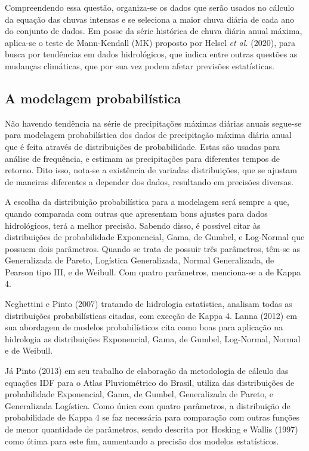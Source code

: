 Compreendendo essa questão, organiza-se os dados que serão usados no cálculo da equação das chuvas intensas e se seleciona a maior chuva diária de cada ano do conjunto de dados. Em posse da série histórica de chuva diária anual máxima, aplica-se o teste de Mann-Kendall (MK) proposto por Helsel \textit{et al.} (2020), para busca por tendências em dados hidrológicos, que indica entre outras questões as mudanças climáticas, que por sua vez podem afetar previsões estatísticas.

\subsection{A modelagem probabilística}

Não havendo tendência na série de precipitações máximas diárias anuais segue-se para modelagem probabilística dos dados de precipitação máxima diária anual que é feita através de distribuições de probabilidade. Estas são usadas para análise de frequência, e estimam as precipitações para diferentes tempos de retorno. Dito isso, nota-se a existência de variadas distribuições, que se ajustam de maneiras diferentes a depender dos dados, resultando em precisões diversas. 

A escolha da distribuição probabilística para a modelagem será sempre a que, quando comparada com outras que apresentam bons ajustes para dados hidrológicos, terá a melhor precisão. Sabendo disso, é possível citar às distribuições de probabilidade Exponencial, Gama, de Gumbel, e Log-Normal que possuem dois parâmetros. Quando se trata de possuir três parâmetros, têm-se as Generalizada de Pareto, Logística Generalizada, Normal Generalizada, de Pearson tipo III, e de Weibull. Com quatro parâmetros, menciona-se a de Kappa 4.

Neghettini e Pinto (2007) tratando de hidrologia estatística, analisam todas as distribuições probabilísticas citadas, com exceção de Kappa 4. Lanna (2012) em sua abordagem de modelos probabilísticos cita como boas para aplicação na hidrologia as distribuições Exponencial, Gama, de Gumbel, Log-Normal, Normal e de Weibull. 

Já Pinto (2013) em seu trabalho de elaboração da metodologia de cálculo das equações IDF para o Atlas Pluviométrico do Brasil, utiliza das distribuições de probabilidade Exponencial, Gama, de Gumbel, Generalizada de Pareto, e Generalizada Logística. Como única com quatro parâmetros, a distribuição de probabilidade de Kappa 4 se faz necessária para comparação com outras funções de menor quantidade de parâmetros, sendo descrita por Hosking e Wallis (1997) como ótima para este fim, aumentando a precisão dos modelos estatísticos.


